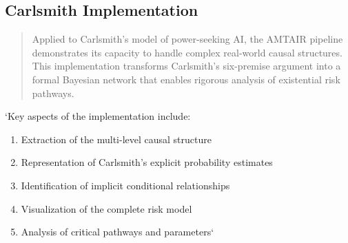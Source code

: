 \documentclass[12pt,a4paper]{report}
\providecommand{\tightlist}{%
  \setlength{\itemsep}{0pt}\setlength{\parskip}{0pt}}
\begin{document}
\subsection{Carlsmith
Implementation}\label{sec-carlsmith-implementation}

\begin{quote}
Applied to Carlsmith's model of power-seeking AI, the AMTAIR pipeline
demonstrates its capacity to handle complex real-world causal
structures. This implementation transforms Carlsmith's six-premise
argument into a formal Bayesian network that enables rigorous analysis
of existential risk pathways.
\end{quote}

`Key aspects of the implementation include:

\begin{enumerate}
\def\labelenumi{\arabic{enumi}.}
\tightlist
\item
  Extraction of the multi-level causal structure
\item
  Representation of Carlsmith's explicit probability estimates
\item
  Identification of implicit conditional relationships
\item
  Visualization of the complete risk model
\item
  Analysis of critical pathways and parameters`
\end{enumerate}

\begin{Shaded}
\begin{Highlighting}[]
\OperatorTok{=}\NormalTok{):}
\OperatorTok{=}\NormalTok{)}
    
\OperatorTok{=}\NormalTok{)}
\OperatorTok{=}\OperatorTok{=}
    
\OperatorTok{=}
\OperatorTok{=}
\OperatorTok{=}\NormalTok{,}
\OperatorTok{=}
\OperatorTok{=}\NormalTok{,}
\OperatorTok{=}
\NormalTok{    )}
    
\end{Highlighting}
\end{Shaded}
\end{document}
